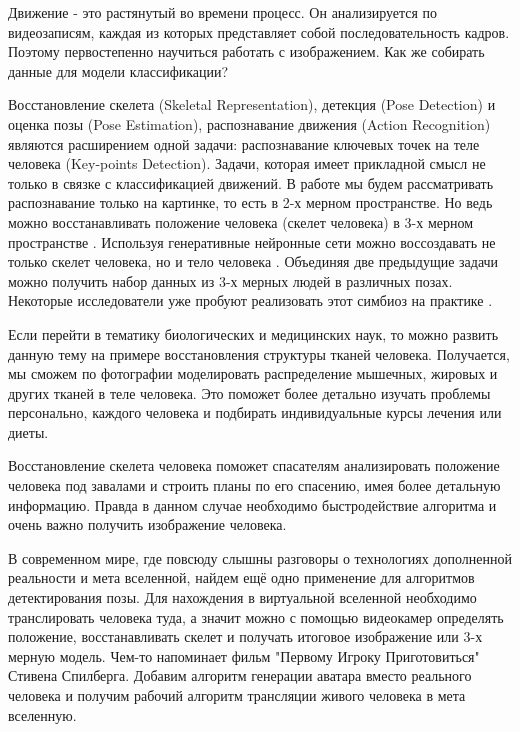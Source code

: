 \hfill \break
Движение - это растянутый во времени процесс. Он анализируется по видеозаписям, каждая из которых представляет собой последовательность кадров. Поэтому первостепенно научиться работать с изображением. Как же собирать данные для модели классификации?

Восстановление скелета (Skeletal Representation), детекция (Pose Detection) и оценка позы (Pose Estimation), распознавание движения (Action Recognition) являются расширением одной задачи: распознавание ключевых точек на теле человека (Key-points Detection). Задачи, которая имеет прикладной смысл не только в связке с классификацией движений. В работе мы будем рассматривать распознавание только на картинке, то есть в 2-х мерном пространстве. Но ведь можно восстанавливать положение человека (скелет человека) в 3-х мерном пространстве \cite{WANG2021103225} \cite{8100086}. Используя генеративные нейронные сети можно воссоздавать не только скелет человека, но и тело человека \cite{Zhang_2017_CVPR}. Объединяя две предыдущие задачи можно получить набор данных из 3-х мерных людей в различных позах. Некоторые исследователи уже пробуют реализовать этот симбиоз на практике \cite{varol17_surreal}.

Если перейти в тематику биологических и медицинских наук, то можно развить данную тему на примере восстановления структуры тканей человека. Получается, мы сможем по фотографии моделировать распределение мышечных, жировых и других тканей в теле человека. Это поможет более детально изучать проблемы персонально, каждого человека и подбирать индивидуальные курсы лечения или диеты.

Восстановление скелета человека поможет спасателям анализировать положение человека под завалами и строить планы по его спасению, имея более детальную информацию. Правда в данном случае необходимо быстродействие алгоритма и очень важно получить изображение человека.

В современном мире, где повсюду слышны разговоры о технологиях дополненной реальности и мета вселенной, найдем ещё одно применение для алгоритмов детектирования позы. Для нахождения в виртуальной вселенной необходимо транслировать человека туда, а значит можно с помощью видеокамер определять положение, восстанавливать скелет и получать итоговое изображение или 3-х мерную модель. Чем-то напоминает фильм "Первому Игроку Приготовиться"{} Стивена Спилберга. Добавим алгоритм генерации аватара вместо реального человека и получим рабочий алгоритм трансляции живого человека в мета вселенную.

